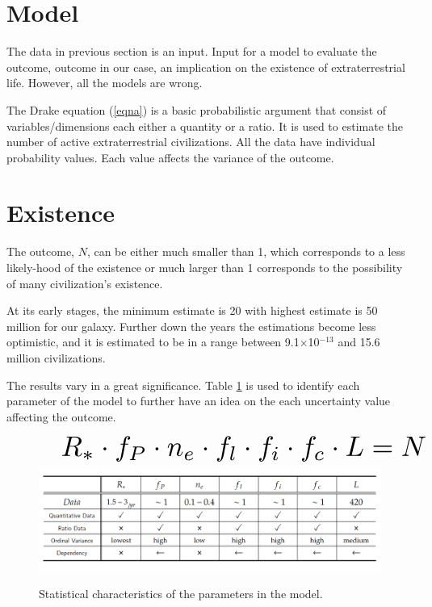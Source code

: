\documentclass{ieeeaccess}
\begin{document}
\section{Model}
The data in previous section is an input. Input for a model to evaluate the outcome, outcome in our case, an implication on the existence of extraterrestrial life. However, all the models are wrong.

The Drake equation (\ref{eqna}) is a basic probabilistic argument that consist of variables/dimensions each either a quantity or a ratio.
It is used to estimate the number of active extraterrestrial civilizations. All the data have individual probability values. Each value affects the variance of the outcome.

\vspace{-1em}
\section{Existence}
The outcome, $N$, can be either much smaller than 1, which corresponds to a less likely-hood of the existence or much larger than 1 corresponds to the possibility of many civilization's existence.

At its early stages, the minimum estimate is 20 with highest estimate is 50 million for our galaxy. Further down the years the estimations become less optimistic, and it is estimated to be in a range between 9.1$\times$10${}^{-13}$ and 15.6 million civilizations.

The results vary in a great significance.
Table \ref{table} is used to identify each parameter of the model to further have an idea on the each uncertainty value affecting the outcome.
\begin{figure}[!b]
    \begin{equation}
        \scalebox{2.5}{ \text{ $R_* \cdot f_P \cdot n_e \cdot f_l \cdot f_i \cdot f_c \cdot L = N$}}
        \label{eqna}
    \end{equation}
    \centering
    \includegraphics[width=0.96\linewidth]{table.png}
    \caption{Statistical characteristics of the parameters in the model.}
    \vspace{2em}
    \label{table}
\end{figure}

\EOD
\end{document}

